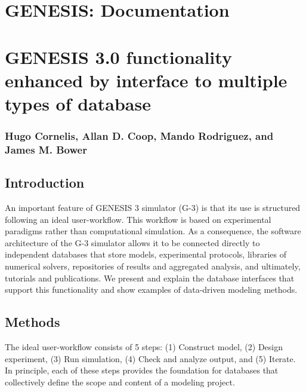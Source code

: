 \documentclass[12pt]{article}
\begin{document}
\section*{GENESIS: Documentation}

\section*{GENESIS 3.0 functionality enhanced by interface to multiple types of database}

\subsubsection*{Hugo Cornelis, Allan D. Coop, Mando Rodriguez, and James M. Bower}

\subsection*{Introduction}

An important feature of GENESIS 3 simulator (G-3) is that its use is
structured following an ideal user-workflow.  This workflow is based
on experimental paradigms rather than computational simulation.  As a
consequence, the software architecture of the G-3 simulator allows it to be
connected directly to independent databases that store models, experimental protocols, libraries of numerical solvers, repositories of results and
aggregated analysis, and ultimately, tutorials and publications.  We
present and explain the database interfaces that support this functionality and show examples of
data-driven modeling methods.



\subsection*{Methods}

The ideal user-workflow consists of 5 steps: (1) Construct model, (2) Design experiment, (3) Run simulation, (4) Check and analyze output, and (5) Iterate. In principle, each of these steps provides the foundation for databases that collectively define the scope and content of a modeling project. 
\end{document}

